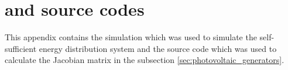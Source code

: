 \chapter{\altmatlab and \altmaple source codes} \label{sec:matlab_source_codes}
This appendix contains the \MATLAB simulation which was used to simulate the self-sufficient energy distribution system and the \MAPLE source code which was used to calculate the Jacobian matrix in the subsection \ref{sec:photovoltaic_generators}. 


